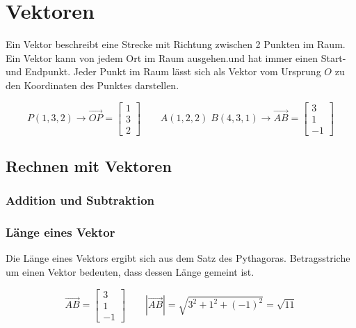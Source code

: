 \section{Vektoren}

Ein Vektor beschreibt eine Strecke mit Richtung zwischen 2 Punkten im Raum.
Ein Vektor kann von jedem Ort im Raum ausgehen.und hat immer einen Start- und Endpunkt. 
Jeder Punkt im Raum lässt sich als Vektor vom Ursprung $O$ zu den Koordinaten des Punktes
darstellen.

\begin{equation*}
    P (1, 3, 2) \rightarrow \overrightarrow{OP} = \begin{bmatrix}
        1 \\
        3 \\
        2
    \end{bmatrix}
    \qquad A (1, 2, 2) \; B (4, 3, 1) \rightarrow \overrightarrow{AB} = \begin{bmatrix}
        3 \\
        1 \\
        -1
    \end{bmatrix}
\end{equation*}

\subsection{Rechnen mit Vektoren}

\subsubsection{Addition und Subtraktion}

\subsubsection{Länge eines Vektor}

Die Länge eines Vektors ergibt sich aus dem Satz des Pythagoras.
Betragsstriche um einen Vektor bedeuten, dass dessen Länge gemeint ist.

\begin{equation*}
    \overrightarrow{AB} = \begin{bmatrix}
        3 \\
        1 \\
        -1
    \end{bmatrix}
    \qquad | \overrightarrow{AB} | = \sqrt{3^2 + 1^2 + (-1)^2} = \sqrt{11}
\end{equation*}

